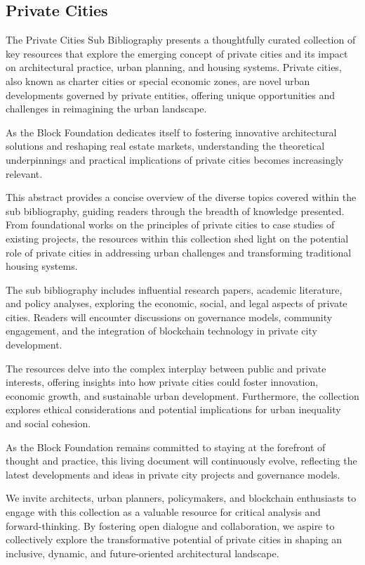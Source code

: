 \subsection{Private Cities}



The Private Cities Sub Bibliography presents a thoughtfully curated collection of key resources that explore the emerging concept of private cities and its impact on architectural practice, urban planning, and housing systems. Private cities, also known as charter cities or special economic zones, are novel urban developments governed by private entities, offering unique opportunities and challenges in reimagining the urban landscape.

As the Block Foundation dedicates itself to fostering innovative architectural solutions and reshaping real estate markets, understanding the theoretical underpinnings and practical implications of private cities becomes increasingly relevant.

This abstract provides a concise overview of the diverse topics covered within the sub bibliography, guiding readers through the breadth of knowledge presented. From foundational works on the principles of private cities to case studies of existing projects, the resources within this collection shed light on the potential role of private cities in addressing urban challenges and transforming traditional housing systems.

The sub bibliography includes influential research papers, academic literature, and policy analyses, exploring the economic, social, and legal aspects of private cities. Readers will encounter discussions on governance models, community engagement, and the integration of blockchain technology in private city development.

The resources delve into the complex interplay between public and private interests, offering insights into how private cities could foster innovation, economic growth, and sustainable urban development. Furthermore, the collection explores ethical considerations and potential implications for urban inequality and social cohesion.

As the Block Foundation remains committed to staying at the forefront of thought and practice, this living document will continuously evolve, reflecting the latest developments and ideas in private city projects and governance models.

We invite architects, urban planners, policymakers, and blockchain enthusiasts to engage with this collection as a valuable resource for critical analysis and forward-thinking. By fostering open dialogue and collaboration, we aspire to collectively explore the transformative potential of private cities in shaping an inclusive, dynamic, and future-oriented architectural landscape.





